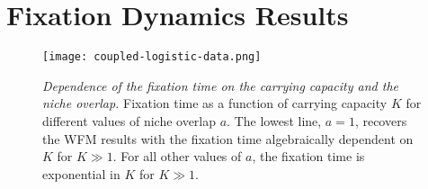 \documentclass[a4paper,10pt]{article}
\numberwithin{equation}{section} %
\begin{document}
\section{Fixation Dynamics Results}

\begin{figure}[ht]
\centering
\texttt{[image: coupled-logistic-data.png]}
\caption{\emph{Dependence of the fixation time on the carrying capacity and the niche overlap.}  Fixation time as a function of carrying capacity $K$ for different values of niche overlap $a$. The lowest line, $a=1$, recovers the WFM results with the fixation time algebraically dependent on $K$ for $K\gg 1$. For all other values of $a$, the fixation time is exponential in $K$ for $K\gg 1$. } \label{lntauvK}
\end{figure}
\end{document}
